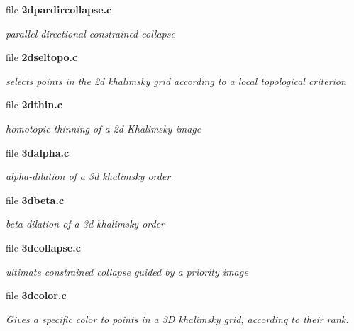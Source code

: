 \begin{CompactItemize}
\item 
file {\bf 2dpardircollapse.c}
\begin{CompactList}\small\item\em parallel directional constrained collapse \item\end{CompactList}

\item 
file {\bf 2dseltopo.c}
\begin{CompactList}\small\item\em selects points in the 2d khalimsky grid according to a local topological criterion \item\end{CompactList}

\item 
file {\bf 2dthin.c}
\begin{CompactList}\small\item\em homotopic thinning of a 2d Khalimsky image \item\end{CompactList}

\item 
file {\bf 3dalpha.c}
\begin{CompactList}\small\item\em alpha-dilation of a 3d khalimsky order \item\end{CompactList}

\item 
file {\bf 3dbeta.c}
\begin{CompactList}\small\item\em beta-dilation of a 3d khalimsky order \item\end{CompactList}

\item 
file {\bf 3dcollapse.c}
\begin{CompactList}\small\item\em ultimate constrained collapse guided by a priority image \item\end{CompactList}

\item 
file {\bf 3dcolor.c}
\begin{CompactList}\small\item\em Gives a specific color to points in a 3D khalimsky grid, according to their rank. \item\end{CompactList}


\end{CompactItemize}

